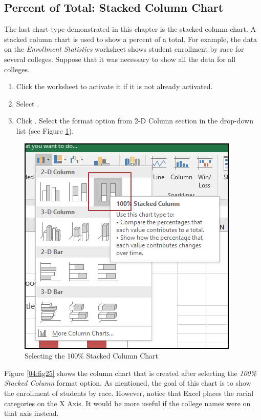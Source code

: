 \subsection{Percent of Total: Stacked Column Chart}

The last chart type demonstrated in this chapter is the stacked column chart. A stacked column chart is used  to show a percent of a total. For example, the data on the \textit{Enrollment Statistics} worksheet shows student enrollment by race for several colleges. Suppose that it was necessary to show all the data for all colleges.

\begin{enumerate}
	\item Click the  worksheet to activate it if it is not already activated.
	\item Select .
	\item Click .	Select the  format option from 2-D Column section in the drop-down list (see Figure \ref{04:fig24}).
\end{enumerate}

\begin{figure}[H]
	\centering
	\includegraphics[width=\maxwidth{.65\linewidth}]{gfx/ch04_fig24}
	\caption{Selecting the 100\% Stacked Column Chart}
	\label{04:fig24}
\end{figure}

Figure \ref{04:fig25} shows the column chart that is created after selecting the \textit{100\% Stacked Column} format option. As mentioned, the goal of this chart is to show the enrollment of students by race. However, notice that Excel places the racial categories on the X Axis. It would be more useful if the college names were on that axis instead.

